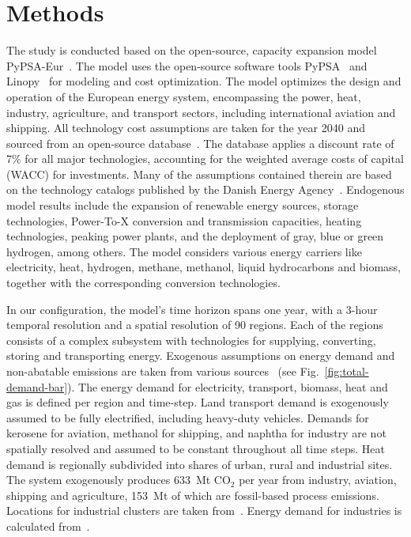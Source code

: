 \documentclass[twocolumn]{article}
\newcommand{\carbon}{CO$_2$}
\begin{document}
\section*{Methods}
\label{sec:methodology}

The study is conducted based on the open-source, capacity expansion model PyPSA-Eur~\cite{horschPyPSAEurOpenOptimisation2018,brownSynergiesSectorCoupling2018,PyPSAEurSecSectorCoupledOpen2023}.
The model uses the open-source software tools PyPSA~\cite{brownPyPSAPythonPower2018} and Linopy~\cite{hofmannLinopyLinearOptimization2023}
for modeling and cost optimization.
The model optimizes the design and operation of the European energy system, encompassing the power, heat, industry, agriculture, and transport sectors, including international aviation and shipping.
All technology cost assumptions are taken for the year 2040 and sourced from an open-source database~\cite{lisazeyenPyPSATechnologydataTechnology2023}. The database applies a discount rate of 7\% for all major technologies, accounting for the weighted average costs of capital (WACC) for investments.
Many of the assumptions contained therein are based on the technology catalogs published by the Danish Energy Agency~\cite{danishenergyagencyTechnologyDataGeneration2019,thedanishenergyagencyTechnologyDataCarbon2023}.
Endogenous model results include the expansion of renewable energy sources, storage technologies, Power-To-X conversion and transmission capacities, heating technologies, peaking power plants, and the deployment of gray, blue or green hydrogen, among others.
The model considers various energy carriers like electricity, heat, hydrogen, methane, methanol, liquid hydrocarbons and biomass, together with the corresponding conversion technologies.



%
In our configuration, the model's time horizon spans one year, with a 3-hour temporal resolution and a spatial resolution of 90 regions. Each of the regions consists of a complex subsystem with technologies for supplying, converting, storing and transporting energy. Exogenous assumptions on energy demand and non-abatable emissions are taken from various sources~\cite{piamanzGeoreferencedIndustrialSites2018,muehlenpfordtTimeSeries2019,mantzosJRCIDEES20152018,NationalEmissionsReported2023,EurostatCompleteEnergyBalance,uwekrienDemandlib2023} (see Fig.~\ref{fig:total-demand-bar}). The energy demand for electricity, transport, biomass, heat and gas is defined per region and time-step.
Land transport demand is exogenously assumed to be fully electrified, including heavy-duty vehicles.
Demands for kerosene for aviation, methanol for shipping, and naphtha for industry are not spatially resolved and assumed to be constant throughout all time steps.
Heat demand is regionally subdivided into shares of urban, rural and industrial sites.
The system exogenously produces 633~Mt \carbon{} per year from industry, aviation, shipping and agriculture, 153~Mt of which are fossil-based process emissions.
Locations for industrial clusters are taken from~\cite{hotmaps_industrial_db}. Energy demand for industries is calculated from~\cite{mantzosJRCIDEES20152018}.
\end{document}
